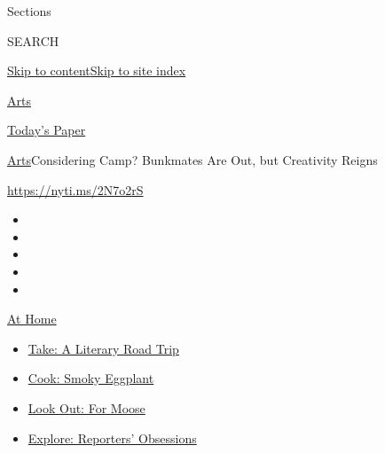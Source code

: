 Sections

SEARCH

\protect\hyperlink{site-content}{Skip to
content}\protect\hyperlink{site-index}{Skip to site index}

\href{https://www.nytimes3xbfgragh.onion/section/arts}{Arts}

\href{https://myaccount.nytimes3xbfgragh.onion/auth/login?response_type=cookie\&client_id=vi}{}

\href{https://www.nytimes3xbfgragh.onion/section/todayspaper}{Today's
Paper}

\href{/section/arts}{Arts}\textbar{}Considering Camp? Bunkmates Are Out,
but Creativity Reigns

\url{https://nyti.ms/2N7o2rS}

\begin{itemize}
\item
\item
\item
\item
\item
\end{itemize}

\href{https://www.nytimes3xbfgragh.onion/spotlight/at-home?action=click\&pgtype=Article\&state=default\&region=TOP_BANNER\&context=at_home_menu}{At
Home}

\begin{itemize}
\tightlist
\item
  \href{https://www.nytimes3xbfgragh.onion/2020/07/28/books/time-for-a-literary-road-trip.html?action=click\&pgtype=Article\&state=default\&region=TOP_BANNER\&context=at_home_menu}{Take:
  A Literary Road Trip}
\item
  \href{https://www.nytimes3xbfgragh.onion/2020/07/29/magazine/bored-with-your-home-cooking-some-smoky-eggplant-will-fix-that.html?action=click\&pgtype=Article\&state=default\&region=TOP_BANNER\&context=at_home_menu}{Cook:
  Smoky Eggplant}
\item
  \href{https://www.nytimes3xbfgragh.onion/2020/07/27/travel/moose-michigan-isle-royale.html?action=click\&pgtype=Article\&state=default\&region=TOP_BANNER\&context=at_home_menu}{Look
  Out: For Moose}
\item
  \href{https://www.nytimes3xbfgragh.onion/interactive/2020/at-home/even-more-reporters-editors-diaries-lists-recommendations.html?action=click\&pgtype=Article\&state=default\&region=TOP_BANNER\&context=at_home_menu}{Explore:
  Reporters' Obsessions}
\end{itemize}

